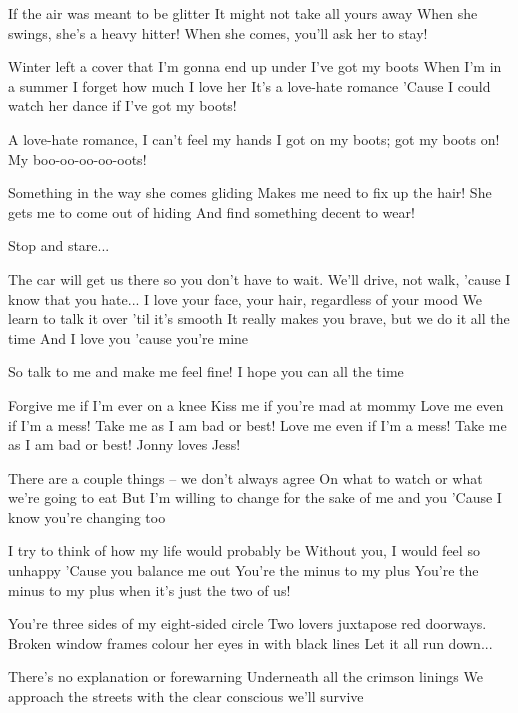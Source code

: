 If the air was meant to be glitter
It might not take all yours away
When she swings, she's a heavy hitter!
When she comes, you'll ask her to stay!

Winter left a cover that I'm gonna end up under
I've got my boots
When I'm in a summer I forget how much I love her
It's a love-hate romance
'Cause I could watch her dance if I've got my boots!

A love-hate romance, I can't feel my hands
I got on my boots; got my boots on!
My boo-oo-oo-oo-oots!

Something in the way she comes gliding
Makes me need to fix up the hair!
She gets me to come out of hiding
And find something decent to wear!

Stop and stare...


The car will get us there so you don't have to wait.
We'll drive, not walk, 'cause I know that you hate...
I love your face, your hair, regardless of your mood
We learn to talk it over 'til it's smooth
It really makes you brave, but we do it all the time
And I love you 'cause you're mine

So talk to me and make me feel fine!
I hope you can all the time

Forgive me if I'm ever on a knee
Kiss me if you're mad at mommy
Love me even if I'm a mess!
Take me as I am bad or best!
Love me even if I'm a mess! Take me as I am bad or best!
Jonny loves Jess!

There are a couple things -- we don't always agree
On what to watch or what we're going to eat
But I'm willing to change for the sake of me and you
'Cause I know you're changing too

I try to think of how my life would probably be
Without you, I would feel so unhappy
'Cause you balance me out
You're the minus to my plus
You're the minus to my plus when it's just the two of us!


You're three sides of my eight-sided circle
Two lovers juxtapose red doorways.
Broken window frames colour her eyes in with black lines
Let it all run down...

There's no explanation or forewarning
Underneath all the crimson linings
We approach the streets with the clear conscious we'll survive

